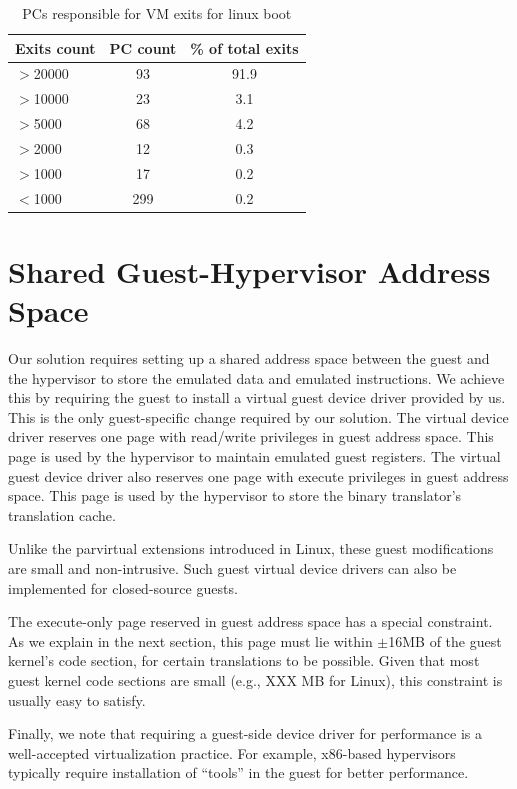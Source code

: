 \documentclass[10pt,twocolumn]{article}
\begin{document}
\begin{table}[!b]
\centering
\caption{PCs responsible for VM exits for linux boot}
     \begin{tabular}{lcc} \hline
       Exits count  & PC count & \% of total exits  \\ \hline
       $>$20000 & 93 & 91.9  \\
       $>$10000 & 23 & 3.1  \\
       $>$5000 & 68 & 4.2  \\
       $>$2000 & 12 & 0.3 \\
       $>$1000 & 17 & 0.2 \\
       $<$1000 & 299 & 0.2 \\
       \hline
     \end{tabular}
\label{tab:NumPCBase}
\end{table}
\section{Shared Guest-Hypervisor Address Space}
\label{sec:sharedspace}
Our solution requires setting up a shared address space between the
guest and the hypervisor to store the emulated
data and emulated instructions.
We achieve this by requiring the guest to install a virtual guest
device driver provided by us. This is the
only guest-specific change required by our solution. The virtual
device driver reserves
one page with read/write privileges in guest address space. This page
is used by the hypervisor to maintain
emulated guest registers. The virtual guest device driver also
reserves one page with execute privileges in guest address space.
This page is used by the hypervisor to store the binary translator's
translation cache.

Unlike the parvirtual extensions introduced in Linux, these guest
modifications are small and non-intrusive. Such guest virtual device drivers
can also be implemented for closed-source guests.

The execute-only page reserved in guest address space has a special
constraint. As we explain in the
next section, this page must lie within $\pm$16MB of the
guest kernel's code section, for certain translations to be possible.
Given that most guest kernel code sections are
small (e.g., XXX MB for Linux), this constraint is usually easy to satisfy.

Finally, we note that requiring a guest-side device driver for performance
is a well-accepted virtualization practice. For example, x86-based hypervisors
typically require installation of ``tools'' in the guest for better performance.
\end{document}
